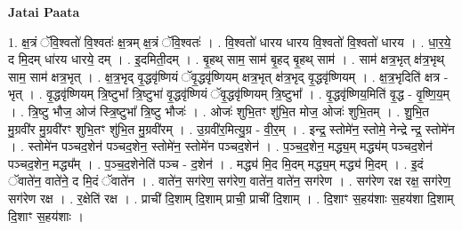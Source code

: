 \documentclass[17pt]{extarticle}
\begin{document}
\textbf{Jatai Paata} \newline

1. क्ष॒त्रं ॅवि॒श्वतो॑ वि॒श्वतः॑ क्ष॒त्रम् क्ष॒त्रं ॅवि॒श्वतः॑ । . वि॒श्वतो॑ धारय धारय वि॒श्वतो॑ वि॒श्वतो॑ धारय । . धा॒र॒ये॒ द मि॒दम् धा॑रय धारये॒ दम् । . इ॒दमिती॒दम् । . बृ॒हथ् साम॒ साम॑ बृ॒हद् बृ॒हथ् साम॑ । . साम॑ क्षत्र॒भृत् क्ष॑त्र॒भृथ् साम॒ साम॑ क्षत्र॒भृत् । . क्ष॒त्र॒भृद् वृ॒द्धवृ॑ष्णियं ॅवृ॒द्धवृ॑ष्णियम् क्षत्र॒भृत् क्ष॑त्र॒भृद् वृ॒द्धवृ॑ष्णियम् । . क्ष॒त्र॒भृदिति॑ क्षत्र - भृत् । . वृ॒द्धवृ॑ष्णियम् त्रि॒ष्टुभा᳚ त्रि॒ष्टुभा॑ वृ॒द्धवृ॑ष्णियं ॅवृ॒द्धवृ॑ष्णियम् त्रि॒ष्टुभा᳚ । . वृ॒द्धवृ॑ष्णिय॒मिति॑ वृ॒द्ध - वृ॒ष्णि॒य॒म् । . त्रि॒ष्टु भौज॒ ओज॑ स्त्रि॒ष्टुभा᳚ त्रि॒ष्टु भौजः॑ । . ओजः॑ शुभि॒तꣳ शु॑भि॒त मोज॒ ओजः॑ शुभि॒तम् । . शु॒भि॒त मु॒ग्रवी॑र मु॒ग्रवी॑रꣳ शुभि॒तꣳ शु॑भि॒त मु॒ग्रवी॑रम् । . उ॒ग्रवी॑र॒मित्यु॒ग्र - वी॒र॒म् । . इन्द्र॒ स्तोमे॑न॒ स्तोमे॒ नेन्द्रे न्द्र॒ स्तोमे॑न । . स्तोमे॑न पञ्चद॒शेन॑ पञ्चद॒शेन॒ स्तोमे॑न॒ स्तोमे॑न पञ्चद॒शेन॑ । . प॒ञ्च॒द॒शेन॒ मद्ध्य॒म् मद्ध्य॑म् पञ्चद॒शेन॑ पञ्चद॒शेन॒ मद्ध्य᳚म् । . प॒ञ्च॒द॒शेनेति॑ पञ्च - द॒शेन॑ । . मद्ध्य॑ मि॒द मि॒दम् मद्ध्य॒म् मद्ध्य॑ मि॒दम् । . इ॒दं ॅवाते॑न॒ वाते॑ने॒ द मि॒दं ॅवाते॑न । . वाते॑न॒ सग॑रेण॒ सग॑रेण॒ वाते॑न॒ वाते॑न॒ सग॑रेण । . सग॑रेण रक्ष रक्ष॒ सग॑रेण॒ सग॑रेण रक्ष । . र॒क्षेति॑ रक्ष । . प्राची॑ दि॒शाम् दि॒शाम् प्राची॒ प्राची॑ दि॒शाम् । . दि॒शाꣳ स॒हय॑शाः स॒हय॑शा दि॒शाम् दि॒शाꣳ स॒हय॑शाः । \newline
\end{document}
